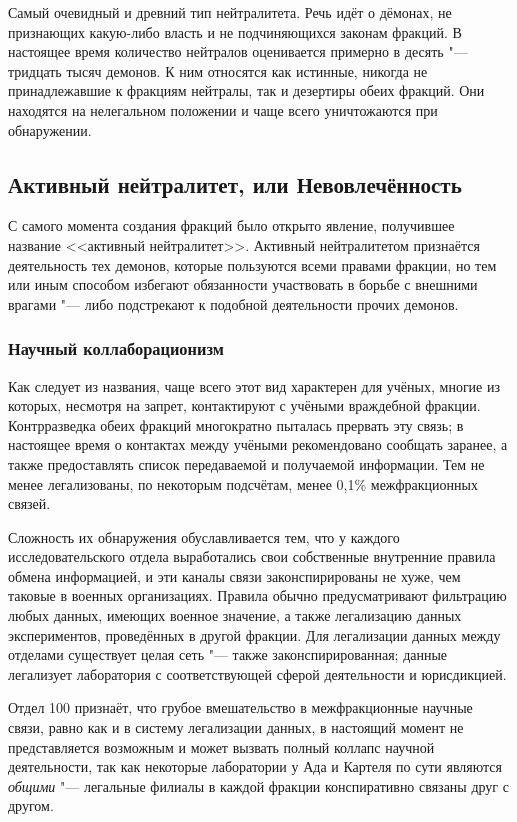 Самый очевидный и древний тип нейтралитета.
Речь идёт о дёмонах, не признающих какую-либо власть и не подчиняющихся законам фракций.
В настоящее время количество нейтралов оценивается примерно в десять "--- тридцать тысяч демонов.
К ним относятся как истинные, никогда не принадлежавшие к фракциям нейтралы, так и дезертиры обеих фракций.
Они находятся на нелегальном положении и чаще всего уничтожаются при обнаружении.

\subsection{Активный нейтралитет, или Невовлечённость}

С самого момента создания фракций было открыто явление, получившее название <<активный нейтралитет>>.
Активный нейтралитетом признаётся деятельность тех демонов, которые пользуются всеми правами фракции, но тем или иным способом избегают обязанности участвовать в борьбе с внешними врагами "--- либо подстрекают к подобной деятельности прочих демонов.

\subsubsection{Научный коллаборационизм}

Как следует из названия, чаще всего этот вид характерен для учёных, многие из которых, несмотря на запрет, контактируют с учёными враждебной фракции.
Контрразведка обеих фракций многократно пыталась прервать эту связь;
в настоящее время о контактах между учёными рекомендовано сообщать заранее, а также предоставлять список передаваемой и получаемой информации.
Тем не менее легализованы, по некоторым подсчётам, менее 0,1\% межфракционных связей.

Сложность их обнаружения обуславливается тем, что у каждого исследовательского отдела выработались свои собственные внутренние правила обмена информацией, и эти каналы связи законспирированы не хуже, чем таковые в военных организациях.
Правила обычно предусматривают фильтрацию любых данных, имеющих военное значение, а также легализацию данных экспериментов, проведённых в другой фракции.
Для легализации данных между отделами существует целая сеть "--- также законспирированная;
данные легализует лаборатория с соответствующей сферой деятельности и юрисдикцией.

Отдел 100 признаёт, что грубое вмешательство в межфракционные научные связи, равно как и в систему легализации данных, в настоящий момент не представляется возможным и может вызвать полный коллапс научной деятельности, так как некоторые лаборатории у Ада и Картеля по сути являются \emph{общими} "--- легальные филиалы в каждой фракции конспиративно связаны друг с другом.

